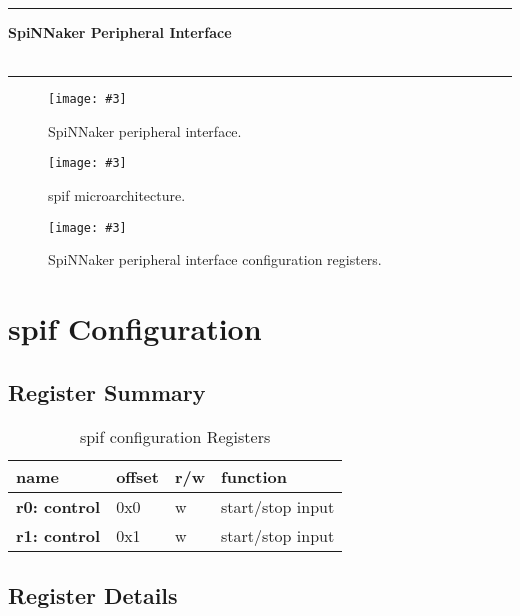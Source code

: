 \documentclass[11pt,a4paper,twoside]{article}
\newcommand{\image}[5][]
{
\begin{figure}[#2]
   \begin{center}
      \texttt{[image: \#3]}
      \caption{#5}
      \label{fig:#4}
   \end{center}
\end{figure}
}
\begin{document}
\rule{\linewidth}{2pt}

\begin{center}
	\textbf{
		\Large{SpiNNaker Peripheral Interface} \\
		\vspace*{0.5cm}
		\large {\myversion} \\
		\large{\mydate}
	}
\end{center}

\rule{\linewidth}{2pt}

\vspace*{1.0cm}


\image[width = \textwidth]{!h}{spin_per_if}{fig:spin_if}
	{SpiNNaker peripheral interface.}


\image[width = \textwidth]{!h}{spif_bd}{fig:spif_bd}
{spif microarchitecture.}


\image[width = 0.9 \textwidth]{!h}{spif_cf}{fig:spif_cf}
{SpiNNaker peripheral interface configuration registers.}


\section{spif Configuration}


\subsection{Register Summary}


\begin{table}[!ht]
	\caption{spif configuration Registers}
	\begin{center}
		\renewcommand{\arraystretch}{1.2}
		\begin{tabularx}{\textwidth}{| p{\ncw} p{\ocw} p{\rcw} X |}
			\hline
			\textbf{name}        & \textbf{offset} & \textbf{r/w} & \textbf{function} \\%
			\hline
			\hline
			\textbf{r0: control} & 0x0             & w            & start/stop input  \\%
			\textbf{r1: control} & 0x1             & w            & start/stop input  \\%
			\hline
		\end{tabularx}
	\end{center}
	\label{tab:spif_regs}
\end{table}


\subsection{Register Details}
\end{document}
